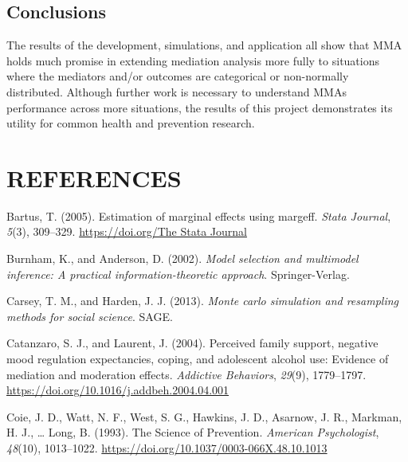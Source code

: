\documentclass[]{DissertateUSU}
\begin{document}
\section{Conclusions}\label{conclusions-4}

The results of the development, simulations, and application all show
that MMA holds much promise in extending mediation analysis more fully
to situations where the mediators and/or outcomes are categorical or
non-normally distributed. Although further work is necessary to
understand MMAs performance across more situations, the results of this
project demonstrates its utility for common health and prevention
research.

\singlespacing

\FloatBarrier

\newpage

 \fancyhead[R]{\thepage} \fancyfoot[C]{}

\chapter*{REFERENCES}

\setlength{\parindent}{-0.5in} \setlength{\leftskip}{0.4in}
\setlength{\parskip}{6pt} \noindent

\hypertarget{refs}{}
\hypertarget{ref-Bartus2005}{}
Bartus, T. (2005). Estimation of marginal effects using margeff.
\emph{Stata Journal}, \emph{5}(3), 309--329.
\href{https://doi.org/The\%20Stata\%20Journal}{https://doi.org/The Stata Journal}

\hypertarget{ref-Burnham2002}{}
Burnham, K., and Anderson, D. (2002). \emph{Model selection and
multimodel inference: A practical information-theoretic approach}.
Springer-Verlag.

\hypertarget{ref-Carsey2013}{}
Carsey, T. M., and Harden, J. J. (2013). \emph{Monte carlo simulation
and resampling methods for social science}. SAGE.

\hypertarget{ref-Catanzaro2004}{}
Catanzaro, S. J., and Laurent, J. (2004). Perceived family support,
negative mood regulation expectancies, coping, and adolescent alcohol
use: Evidence of mediation and moderation effects. \emph{Addictive
Behaviors}, \emph{29}(9), 1779--1797.
\url{https://doi.org/10.1016/j.addbeh.2004.04.001}

\hypertarget{ref-Coie1993}{}
Coie, J. D., Watt, N. F., West, S. G., Hawkins, J. D., Asarnow, J. R.,
Markman, H. J., \ldots{} Long, B. (1993). The Science of Prevention.
\emph{American Psychologist}, \emph{48}(10), 1013--1022.
\url{https://doi.org/10.1037/0003-066X.48.10.1013}
\end{document}
